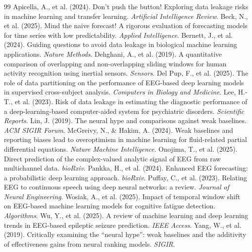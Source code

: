 \documentclass{article}
\begin{document}
\begin{thebibliography}{99}\small
{} Apicella, A., et al. (2024). Don't push the button! Exploring data leakage risks in machine learning and transfer learning. \emph{Artificial Intelligence Review}.
 Beck, N., et al. (2025). Mind the naive forecast! A rigorous evaluation of forecasting models for time series with low predictability. \emph{Applied Intelligence}.
 Bernett, J., et al. (2024). Guiding questions to avoid data leakage in biological machine learning applications. \emph{Nature Methods}.
 Dehghani, A., et al. (2019). A quantitative comparison of overlapping and non-overlapping sliding windows for human activity recognition using inertial sensors. \emph{Sensors}.
 Del Pup, F., et al. (2025). The role of data partitioning on the performance of EEG-based deep learning models in supervised cross-subject analysis. \emph{Computers in Biology and Medicine}.
 Lee, H.-T., et al. (2023). Risk of data leakage in estimating the diagnostic performance of a deep-learning-based computer-aided system for psychiatric disorders. \emph{Scientific Reports}.
 Lin, J. (2019). The neural hype and comparisons against weak baselines. \emph{ACM SIGIR Forum}.
 McGreivy, N., \& Hakim, A. (2024). Weak baselines and reporting biases lead to overoptimism in machine learning for fluid-related partial differential equations. \emph{Nature Machine Intelligence}.
 Onojima, T., et al. (2025). Direct prediction of the complex-valued analytic signal of EEG from raw multichannel data. \emph{bioRxiv}.
 Pankka, H., et al. (2024). Enhanced EEG forecasting: a probabilistic deep learning approach. \emph{bioRxiv}.
 Puffay, C., et al. (2023). Relating EEG to continuous speech using deep neural networks: a review. \emph{Journal of Neural Engineering}.
 Wosiak, A., et al. (2025). Impact of temporal window shift on EEG-based machine learning models for cognitive fatigue detection. \emph{Algorithms}.
 Wu, Y., et al. (2025). A review of machine learning and deep learning trends in EEG-based epileptic seizure prediction. \emph{IEEE Access}.
 Yang, W., et al. (2019). Critically examining the ``neural hype'': weak baselines and the additivity of effectiveness gains from neural ranking models. \emph{SIGIR}.
\end{thebibliography}
\end{document}
